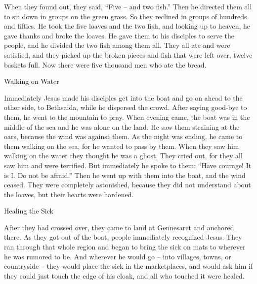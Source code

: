 {When
they found out,
they said,
“Five
– and
two
fish.”
Then
he directed
them
all
to sit down
in groups
on
the green
grass.
So
they reclined
in groups
of
hundreds
and
fifties.
He
took
the five
loaves
and
the two
fish,
and looking up
to
heaven,
he gave thanks
and
broke
the loaves.
He gave
them to his disciples
to
serve
the people,
and
he divided
the two
fish
among them all.
They
all
ate
and
were satisfied,
and
they picked up
the broken pieces
and
fish
that were left over, twelve
baskets
full.
Now there were
five thousand
men
who ate
the bread.
\par }{\SH Walking on Water
\par }{\PP {}Immediately
Jesus made
his
disciples
get
into
the boat
and
go on ahead
to
the other side,
to
Bethsaida,
while
he
dispersed
the crowd.
After saying good-bye
to them,
he went
to
the mountain
to pray.
When evening
came,
the boat
was
in
the middle
of the sea
and
he
was alone
on
the land.
He
saw
them
straining
at
the oars,
because
the wind
was
against
them.
As the night
was ending,
he came
to
them
walking
on
the sea,
for he wanted
to pass by
them.
When
they saw
him
walking
on
the water
they thought
he was
a ghost.
They cried out,
for
they
all
saw
him
and
were terrified.
But
immediately
he spoke
to
them: “Have courage! It is
I.
Do
not
be afraid.”
Then
he went up
with
them
into
the boat,
and
the wind
ceased.
They were
completely
astonished,
because
they did
not
understand
about
the loaves,
but
their
hearts
were
hardened.
\par }{\SH Healing the Sick
\par }{\PP {}After
they had crossed over,
they came
to
land
at
Gennesaret
and
anchored there.
As
they
got out
of
the boat,
people immediately
recognized
Jesus.
They ran
through that
whole
region
and
began
to bring
the sick
on
mats
to wherever
he was rumored
to be.
And
wherever
he would go
– into
villages,
towns,
or
countryside
– they would place
the sick
in
the marketplaces,
and
would ask
him
if
they could just touch
the edge
of his
cloak,
and
all
who
touched
it
were healed.

}
